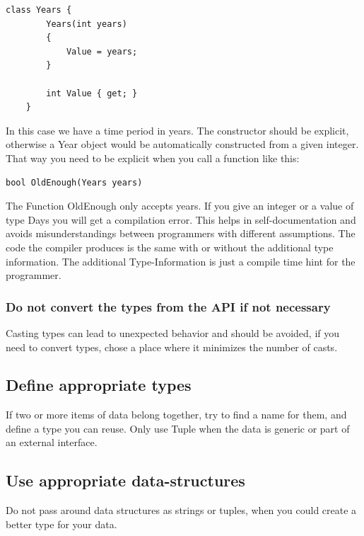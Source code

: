 \documentclass[11pt,a4paper]{article}
\begin{document}
\begin{lstlisting}[language={[Sharp]C}, caption={Declaring the new type Years}]
    class Years {
        Years(int years)
        {
            Value = years;
        }

        int Value { get; }
    }
\end{lstlisting}

In this case we have a time period in years. The constructor should be explicit, otherwise a Year object would be automatically constructed from a given integer. That way you need to be explicit when you call a function like this:

\begin{lstlisting}[language={[Sharp]C}, caption={Use the new type}]
bool OldEnough(Years years)
\end{lstlisting}

The Function OldEnough only accepts years. If you give an integer or a value of type Days you will get a compilation error. This helps in self-documentation and avoids misunderstandings between programmers with different assumptions. The code the compiler produces is the same with or without the additional type information. The additional Type-Information is just a compile time hint for the programmer.

\subsubsection{Do not convert the types from the API if not necessary}

Casting types can lead to unexpected behavior and should be avoided, if you need to convert types, chose a place where it minimizes the number of casts.

\subsection{Define appropriate types}

If two or more items of data belong together, try to find a name for them, and define a type you can reuse. Only use Tuple when the data is generic or part of an external interface.

\subsection{Use appropriate data-structures}

Do not pass around data structures as strings or tuples, when you could create a better type for your data.
\end{document}
